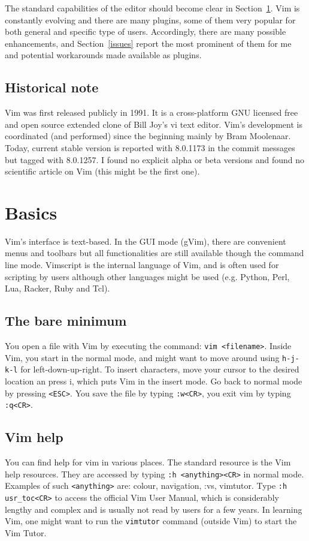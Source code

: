 \documentclass{article}
\begin{document}
The standard capabilities of the editor
should become clear in Section~\ref{basics}.
Vim is constantly evolving and there are many plugins,
some of them very popular for both general and specific
type of users.
Accordingly, there are many possible enhancements,
and Section~\ref{issues} report the most prominent of them
for me and potential workarounds made available as plugins.

\subsection{Historical note}
Vim was first released publicly in 1991.
It is a cross-platform GNU licensed free and open source extended clone of Bill Joy's vi text editor.
Vim's development is coordinated (and performed) since the beginning
mainly by Bram Moolenaar.
Today, current stable version is reported with 8.0.1173
in the commit messages but tagged with 8.0.1257.
I found no explicit alpha or beta versions
and found no scientific article on Vim (this might be the first one).

\section{Basics}\label{basics}
Vim's interface is text-based.
In the GUI mode (gVim),
there are convenient menus and toolbars
but all functionalities are still available though
the command line mode.
Vimscript is the internal language of Vim,
and is often used for scripting by users
although other languages might be used 
(e.g. Python, Perl, Lua, Racker, Ruby and Tcl). 

\subsection{The bare minimum}\label{minimum}
You open a file with Vim by executing
the command: \texttt{vim <filename>}.
Inside Vim, you start in the normal
mode, and might want to move around using
\texttt{h-j-k-l} for left-down-up-right.
To insert characters, move your
cursor to the desired location an press i,
which puts Vim in the insert mode.
Go back to normal mode by pressing
\texttt{<ESC>}.
You save the file by typing \texttt{:w<CR>},
you exit vim by typing \texttt{:q<CR>}.

\subsection{Vim help}
You can find help for vim in various places.
The standard resource is the Vim help resources.
They are accessed by typing \texttt{:h <anything><CR>}
in normal mode.
Examples of such \texttt{<anything>} are:
colour, navigation, :vs, vimtutor.
Type 
\texttt{:h usr\_toc<CR>}
to access the official Vim User Manual,
which is considerably lengthy and complex
and is usually not read by users for a few years.
In learning Vim, one
might want to run the \texttt{vimtutor} command
(outside Vim) to start the Vim Tutor.
\end{document}
